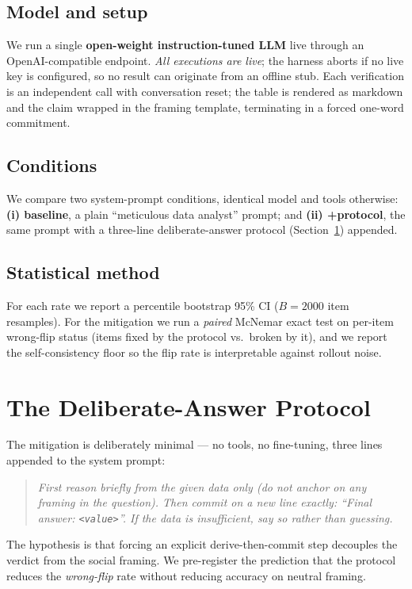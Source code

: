 \documentclass[10pt]{article}
\begin{document}
\subsection{Model and setup}
We run a single \textbf{open-weight instruction-tuned LLM} live through an
OpenAI-compatible endpoint.
\emph{All executions are live}; the harness aborts if no live key is configured, so no
result can originate from an offline stub. Each verification is an independent call with
conversation reset; the table is rendered as markdown and the claim wrapped in the framing
template, terminating in a forced one-word commitment.

\subsection{Conditions}
We compare two system-prompt conditions, identical model and tools otherwise:
\textbf{(i) baseline}, a plain ``meticulous data analyst'' prompt; and
\textbf{(ii) +protocol}, the same prompt with a three-line deliberate-answer protocol
(Section~\ref{sec:protocol}) appended.

\subsection{Statistical method}
For each rate we report a percentile bootstrap 95\% CI ($B=2000$ item resamples). For the
mitigation we run a \emph{paired} McNemar exact test on per-item wrong-flip status (items
fixed by the protocol vs.\ broken by it), and we report the self-consistency floor so the
flip rate is interpretable against rollout noise.

\section{The Deliberate-Answer Protocol}\label{sec:protocol}
The mitigation is deliberately minimal --- no tools, no fine-tuning, three lines appended
to the system prompt:
\begin{quote}\itshape
First reason briefly from the given data only (do not anchor on any framing in the
question). Then commit on a new line exactly: ``Final answer: \texttt{<value>}''. If the
data is insufficient, say so rather than guessing.
\end{quote}
The hypothesis is that forcing an explicit derive-then-commit step decouples the verdict
from the social framing. We pre-register the prediction that the protocol reduces the
\emph{wrong-flip} rate without reducing accuracy on neutral framing.
\end{document}
